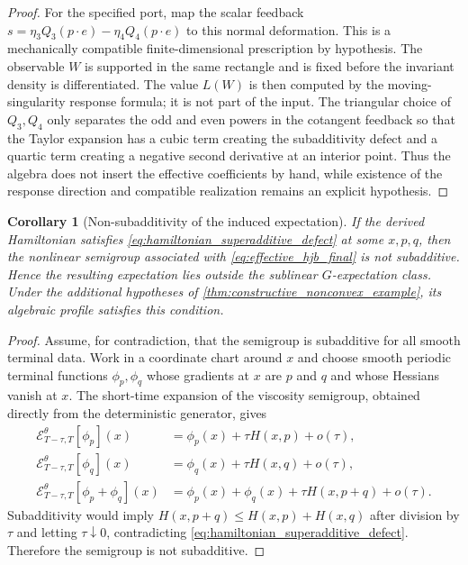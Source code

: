 \documentclass[12pt, letterpaper]{amsart}
\newcommand{\Ecal}{\mathcal{E}}
\theoremstyle{plain}
\newtheorem{corollary}[theorem]{Corollary}
\theoremstyle{definition}
\theoremstyle{remark}
\begin{document}
\begin{proof}
For the specified port, map the scalar feedback
\(s=\eta_3Q_3(p\cdot e)-\eta_4Q_4(p\cdot e)\) to this normal deformation.  This
is a mechanically compatible finite-dimensional prescription by hypothesis.
The observable \(W\) is supported in the same rectangle and is fixed before the
invariant density is differentiated.  The value \(L(W)\) is then computed by
the moving-singularity response formula; it is not part of the input.  The
triangular choice of \(Q_3,Q_4\) only separates the odd and even powers in the
cotangent feedback so that the Taylor expansion has a cubic term creating the
subadditivity defect and a quartic term creating a negative second derivative
at an interior point. Thus the algebra does not insert the effective
coefficients by hand, while existence of the response direction and compatible
realization remains an explicit hypothesis.
\end{proof}

\begin{corollary}[Non-subadditivity of the induced expectation]
\label{cor:non_subadditivity}
If the derived Hamiltonian satisfies \eqref{eq:hamiltonian_superadditive_defect} at some $x,p,q$, then the nonlinear semigroup associated with \eqref{eq:effective_hjb_final} is not subadditive. Hence the resulting expectation lies outside the sublinear $G$-expectation class. Under the additional hypotheses of \cref{thm:constructive_nonconvex_example}, its algebraic profile satisfies this condition.
\end{corollary}

\begin{proof}
Assume, for contradiction, that the semigroup is subadditive for all smooth terminal data.  Work in a coordinate chart around $x$ and choose smooth periodic terminal functions $\phi_p,\phi_q$ whose gradients at $x$ are $p$ and $q$ and whose Hessians vanish at $x$.  The short-time expansion of the viscosity semigroup, obtained directly from the deterministic generator, gives
\begin{align}
    \Ecal_{T-\tau,T}^\theta[\phi_p](x)&=\phi_p(x)+\tau H(x,p)+o(\tau),\\
    \Ecal_{T-\tau,T}^\theta[\phi_q](x)&=\phi_q(x)+\tau H(x,q)+o(\tau),\\
    \Ecal_{T-\tau,T}^\theta[\phi_p+\phi_q](x)&=\phi_p(x)+\phi_q(x)+\tau H(x,p+q)+o(\tau).
\end{align}
Subadditivity would imply $H(x,p+q)\le H(x,p)+H(x,q)$ after division by $\tau$ and letting $\tau\downarrow0$, contradicting \eqref{eq:hamiltonian_superadditive_defect}.  Therefore the semigroup is not subadditive.
\end{proof}
\end{document}
